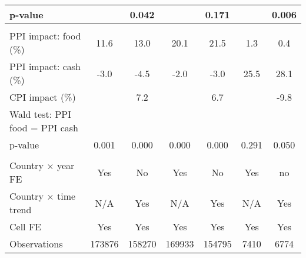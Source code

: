 {\begin{tabular}{l*{6}{c}}
\hspace{25pt} p-value&                     &       0.042         &                     &       0.171         &                     &       0.006         \\
\hline \\ PPI impact: food (\%)&        11.6         &        13.0         &        20.1         &        21.5         &         1.3         &         0.4         \\
PPI impact: cash (\%)&        -3.0         &        -4.5         &        -2.0         &        -3.0         &        25.5         &        28.1         \\
CPI impact (\%)     &                     &         7.2         &                     &         6.7         &                     &        -9.8         \\
Wald test: PPI food = PPI cash&                     &                     &                     &                     &                     &                     \\
\hspace{15pt} p-value&       0.001         &       0.000         &       0.000         &       0.000         &       0.291         &       0.050         \\
\hline \\ Country $\times$ year FE&         Yes         &          No         &         Yes         &          No         &         Yes         &          no         \\
Country $\times$ time trend&         N/A         &         Yes         &         N/A         &         Yes         &         N/A         &         Yes         \\
Cell FE             &         Yes         &         Yes         &         Yes         &         Yes         &         Yes         &         Yes         \\
Observations        &      173876         &      158270         &      169933         &      154795         &        7410         &        6774         \\
\hline\hline
\end{tabular}
}
